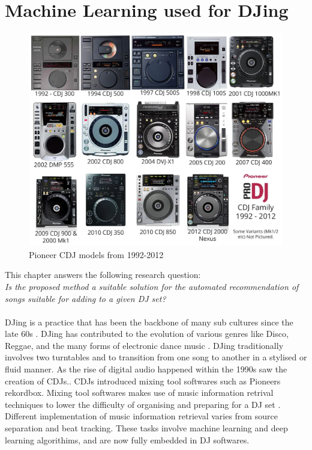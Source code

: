 
\graphicspath{{Chapter3/}}

\chapter{Machine Learning used for DJing}

\begin{figure}[H]
	\includegraphics[scale=0.3]{images/pioneers_history}
	\centering
	\caption{Pioneer CDJ models from 1992-2012 \citep{chesters_history_2017}} 
\end{figure}

This chapter answers the following research question:
\\

\textit{Is the proposed method a suitable solution for the automated recommendation of songs suitable for adding to a given DJ set?} 
\\
\\
DJing is a practice that has been the backbone of many sub cultures since the late 60s \citep{brewster_last_2014}. DJing has contributed to the evolution of various genres like Disco, Reggae, and the many forms of electronic dance music \citep{partridge_dub_2010} \citep{reynolds_energy_2013}. DJing traditionally involves two turntables and to transition from one song to another in a stylised or fluid manner. As the rise of digital audio happened within the 1990s saw the creation of CDJs.. CDJs introduced mixing tool softwares such as Pioneers rekordbox. Mixing tool softwares makes use of music information retrival techniques to lower the difficulty of organising and preparing for a DJ set \citep{kim_automatic_2017}. Different implementation of music information retrieval varies from source separation and beat tracking. These tasks involve machine learning and deep learning algorithims, and are now fully embedded in DJ softwares. 

